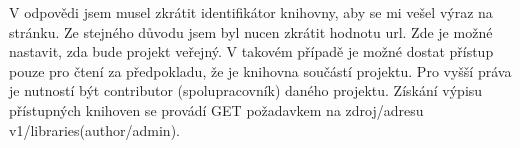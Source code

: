 \par V odpovědi jsem musel zkrátit identifikátor knihovny, aby se mi vešel výraz na stránku. Ze stejného důvodu jsem byl nucen zkrátit hodnotu url. Zde je možné nastavit, zda bude projekt veřejný. V takovém případě je možné dostat přístup pouze pro čtení za předpokladu, že je knihovna součástí projektu. Pro vyšší práva je nutností být contributor (spolupracovník) daného projektu. Získání výpisu přístupných knihoven se provádí GET požadavkem na zdroj/adresu v1/libraries(author/admin).